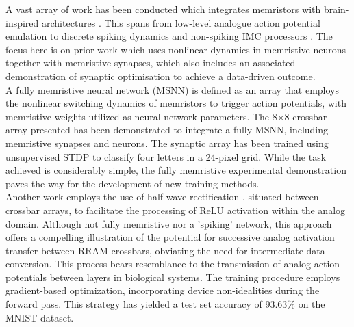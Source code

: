 \noindent A vast array of work has been conducted which integrates memristors with brain-inspired architectures \cite{kang2021build}. This spans from low-level analogue action potential emulation to discrete spiking dynamics and non-spiking IMC processors \cite{eshraghian2022memristor}. The focus here is on prior work which uses nonlinear dynamics in memristive neurons together with memristive synapses, which also includes an associated demonstration of synaptic optimisation to achieve a data-driven outcome. \\

\noindent A fully memristive neural network (MSNN) is defined as an array that employs the nonlinear switching dynamics of memristors to trigger action potentials, with memristive weights utilized as neural network parameters. The 8×8 crossbar array presented \cite{wang2018fully} has been demonstrated to integrate a fully MSNN, including memristive synapses and neurons.  The synaptic array has been trained using unsupervised STDP to classify four letters in a 24-pixel grid. While the task achieved is considerably simple, the fully memristive experimental demonstration paves the way for the development of new training methods. \\



\noindent Another work employs the use of half-wave rectification \cite{kiani2021fully}, situated between crossbar arrays, to facilitate the processing of ReLU activation within the analog domain. Although not fully memristive nor a 'spiking' network, this approach offers a compelling illustration of the potential for successive analog activation transfer between RRAM crossbars, obviating the need for intermediate data conversion. This process bears resemblance to the transmission of analog action potentials between layers in biological systems. The training procedure employs gradient-based optimization, incorporating device non-idealities during the forward pass. This strategy has yielded a test set accuracy of 93.63\% on the MNIST dataset.\\

